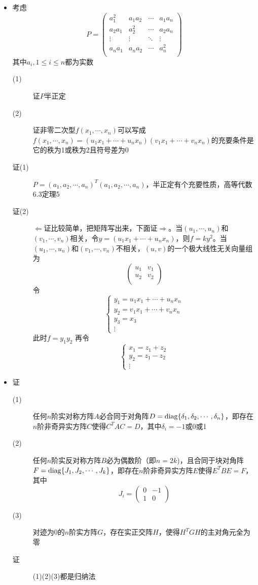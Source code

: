 \begin{itemize}
\item 考虑
\[
P=\left(
\begin{array}{cccc}
a_1^2 & a_1a_2 & \cdots &a_1a_n\\
a_2a_1 & a_2^2 & \cdots &a_2a_n\\
\vdots & \vdots & \ddots & \vdots \\
a_na_1 & a_na_2 & \cdots &a_n^2\\
\end{array}
\right)
\]
其中$a_i,1\leq i \leq n$都为实数
\begin{description}
\item[(1)] 证$P$半正定
\item[(2)] 证非零二次型$f(x_1,\cdots,x_n)$可以写成$f(x_1,\cdots,x_n)=(u_1x_1+\cdots+u_nx_n)(v_1x_1+\cdots+v_nx_n)$的充要条件是它的秩为1或秩为2且符号差为0
\item[证(1)] $P=(a_1,a_2,\cdots,a_n)^T(a_1,a_2,\cdots,a_n)$，半正定有个充要性质，高等代数6.3定理5
\item[证(2)] $\Leftarrow$证比较简单，把矩阵写出来，下面证$\Rightarrow$。当$(u_1,\cdots,u_n)$和$(v_1,\cdots,v_n)$相关，令$y=(u_1x_1+\cdots+u_nx_n)$，则$f=ky^2$。当$(u_1,\cdots,u_n)$和$(v_1,\cdots,v_n)$不相关，$(u,v)$的一个极大线性无关向量组为
\[
\left(
\begin{array}{cc}
u_1 & v_1 \\
u_2 & v_2 \\
\end{array}
\right)
\]
令
\[
\begin{cases}
y_1 = u_1x_1+\cdots+u_nx_n \\
y_2 = v_1x_1+\cdots+v_nx_n \\
y_3 = x_3\\
\vdots
\end{cases}
\]
此时$f=y_1y_2$
再令
\[
\begin{cases}
x_1 = z_1+z_2 \\
y_2 = z_1-z_2 \\
\vdots
\end{cases}
\]
\end{description}

\item 证
\begin{description}
\item[(1)] 任何$n$阶实对称方阵$A$必合同于对角阵$D=\operatorname{diag}\{\delta_1,\delta_2,\cdots,\delta_n\}$，即存在$n$阶非奇异实方阵$C$使得$C^TAC=D$，其中$\delta_i=-1$或0或1
\item[(2)] 任何$n$阶实反对称方阵$B$必为偶数阶（即$n=2k$)，且合同于块对角阵$F=\operatorname{diag}\{J_1,J_2,\cdots,J_k\}$，即存在$n$阶非奇异实方阵$E$使得$E^TBE=F$，其中
\[
J_i=\left(
\begin{array}{cc}
0 & -1 \\
1 & 0
\end{array}
\right)
\]
\item[(3)] 对迹为$0$的$n$阶实方阵$G$，存在实正交阵$H$，使得$H^TGH$的主对角元全为零
\item[证] (1)(2)(3)都是归纳法
\end{description}



\end{itemize}
